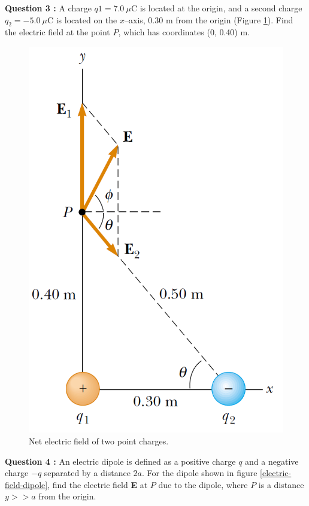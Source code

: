 \documentclass[12pt,a4paper]{article}
\begin{document}
\noindent\textbf{Question 3 \cite[Example 23.5, page 718]{Serway}:} A charge $q1=7.0~\mu$C is located at the origin, and a second charge $q_2=-5.0~\mu$C is located on the $x$--axis, 0.30 m from the origin (Figure \ref{electric-field-two-charges}). Find the electric field at the point $P$, which has coordinates (0, 0.40) m.
\begin{figure}[H]
\centering
\includegraphics[scale=0.45]{Figure23-14.png}
\caption{Net electric field of two point charges.}
\label{electric-field-two-charges}
\end{figure}
\newpage
\noindent\textbf{Question 4 \cite[Example 23.6, page 719]{Serway}:} An electric dipole is defined as a positive charge $q$ and a negative charge $-q$ separated by a distance $2a$. For the dipole shown in figure \ref{electric-field-dipole}, find the electric field \textbf{E} at $P$ due to the dipole, where $P$ is a distance $y >> a$ from the origin.
\end{document}
